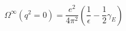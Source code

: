 \begin{equation}
\Omega^{\infty}(q^{2}=0)=\frac{e^{2}}{4\pi^{2}}\left(\frac{1}{\epsilon}-\frac{1}{2}\gamma_{E}\right)
\end{equation}


